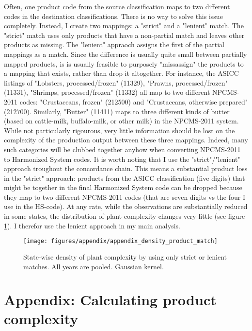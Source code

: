 \documentclass[11pt]{article}
\begin{document}
\begin{appendices}
Often, one product code from the source classification maps to two different codes in the destination classifications. There is no way to solve this issue completely. Instead, I create two mappings: a "strict" and a "lenient" match. The "strict" match uses only products that have a non-partial match and leaves other products as missing. The "lenient" appraoch assigns the first of the partial mappings as a match. Since the difference is usually quite small between partially mapped products, is is usually feasible to purposely "missassign" the products to a mapping that exists, rather than drop it altogether. For instance, the ASICC listings of "Lobsters, processed/frozen" (11329), "Prawns, processed/frozen" (11331), "Shrimps, processed/frozen" (11332) all map to two different NPCMS-2011 codes: "Crustaceans, frozen" (212500) and "Crustaceans, otherwise prepared" (212700). Similarly, "Butter" (11411) maps to three different kinds of butter (based on cattle-milk, buffalo-milk, or other milk) in the NPCMS-2011 system. While not particularly rigourous, very little information should be lost on the complexity of the production output between these three mappings. Indeed, many such categories will be clubbed together anyhow when converting NPCMS-2011 to Harmonized System codes. It is worth noting that I use the "strict"/"lenient" approach troughout the concordance chain. This means a substantial product loss in the "strict" approach: products from the ASICC classification (five digits) that might be together in the final Harmonized System code can be dropped because they map to two different NPCMS-2011 codes (that are seven digits vs the four I use in the HS-code). At any rate, while the observations are substantially reduced in some states, the distribution of plant complexity changes very little (see figure \ref{fig:density_product_match}). I therefor use the lenient approach in my main analysis.

\begin{figure}[htpb]
	\centering
	\texttt{[image: figures/appendix/appendix\_density\_product\_match]}
	\caption{State-wise density of plant complexity by using only strict or lenient matches. All years are pooled. Gaussian kernel.}%
	\label{fig:density_product_match}
\end{figure}

\newpage

\section{Appendix: Calculating product complexity}%
\label{sub:economic_complexity_appendix}


\end{appendices}
\end{document}
